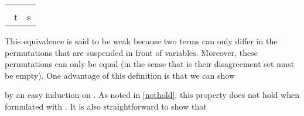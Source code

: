 \begin{isabellebody}
\begin{isamarkuptext}
\begin{center}
\begin{tabular}{c}
  \isa{\mbox{}\inferrule{\mbox{t\isaliteral{5C3C5E697375623E}{}\isactrlisub {\isadigit{1}}\ {\isaliteral{5C3C73696D3E}{\isasymsim}}\ s\isaliteral{5C3C5E697375623E}{}\isactrlisub {\isadigit{1}}}\\\ \mbox{t\isaliteral{5C3C5E697375623E}{}\isactrlisub {\isadigit{2}}\ {\isaliteral{5C3C73696D3E}{\isasymsim}}\ s\isaliteral{5C3C5E697375623E}{}\isactrlisub {\isadigit{2}}}}{\mbox{{\isaliteral{5C3C6C616E676C653E}{\isasymlangle}}t\isaliteral{5C3C5E697375623E}{}\isactrlisub {\isadigit{1}}{\isaliteral{2C}{\isacharcomma}}\ t\isaliteral{5C3C5E697375623E}{}\isactrlisub {\isadigit{2}}{\isaliteral{5C3C72616E676C653E}{\isasymrangle}}\ {\isaliteral{5C3C73696D3E}{\isasymsim}}\ {\isaliteral{5C3C6C616E676C653E}{\isasymlangle}}s\isaliteral{5C3C5E697375623E}{}\isactrlisub {\isadigit{1}}{\isaliteral{2C}{\isacharcomma}}\ s\isaliteral{5C3C5E697375623E}{}\isactrlisub {\isadigit{2}}{\isaliteral{5C3C72616E676C653E}{\isasymrangle}}}}}\hspace{5mm}
  \isa{\mbox{}\inferrule{\mbox{t\ {\isaliteral{5C3C73696D3E}{\isasymsim}}\ t{\isaliteral{27}{\isacharprime}}}}{\mbox{a{\isaliteral{2E}{\isachardot}}t\ {\isaliteral{5C3C73696D3E}{\isasymsim}}\ a{\isaliteral{2E}{\isachardot}}t{\isaliteral{27}{\isacharprime}}}}}\hspace{5mm}
  \isa{\mbox{}\inferrule{\mbox{ds\ {\isaliteral{5C3C70693E}{\isasympi}}\ {\isaliteral{5C3C70693E}{\isasympi}}{\isaliteral{27}{\isacharprime}}\ {\isaliteral{3D}{\isacharequal}}\ {\isaliteral{5C3C656D7074797365743E}{\isasymemptyset}}}}{\mbox{{\isaliteral{5C3C70693E}{\isasympi}}{\isaliteral{5C3C63646F743E}{\isasymcdot}}X\ {\isaliteral{5C3C73696D3E}{\isasymsim}}\ {\isaliteral{5C3C70693E}{\isasympi}}{\isaliteral{27}{\isacharprime}}{\isaliteral{5C3C63646F743E}{\isasymcdot}}X}}}
  \end{tabular}
  \end{center}

  \noindent
  This equivalence is said to be weak because two terms can only differ in the permutations that
  are suspended in front of variables. Moreover, these permutations can only be equal (in the sense that is 
  their disagreement set must be empty). One advantage of this definition is that we can show 

  


  \noindent
  by an easy induction on . As noted in \eqref{nothold}, this property does 
  not hold when formulated with . It is also straightforward to show that


\end{isamarkuptext}
\end{isabellebody}
